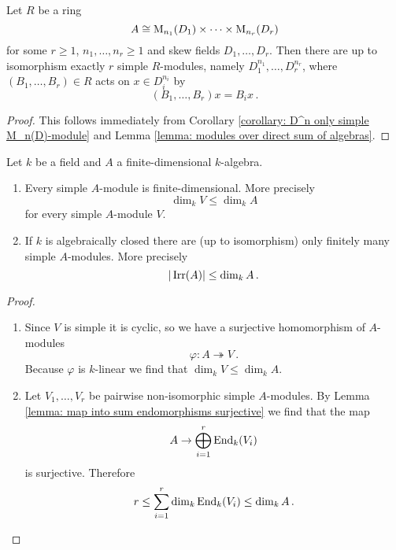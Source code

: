 \begin{corollary}\label{corollary: simple modules over product of matrix algebras}
  Let $R$ be a ring
  \[
                  A
    \cong         \operatorname{M}_{n_1}(D_1)
          \times  \dotsb
          \times  \operatorname{M}_{n_r}(D_r)
  \]
  for some $r \geq 1$, $n_1, \dotsc, n_r \geq 1$ and skew fields $D_1, \dotsc, D_r$.
  Then there are up to isomorphism exactly $r$ simple $R$-modules, namely $D_1^{n_1}, \dotsc, D_r^{n_r}$, where $(B_1, \dotsc, B_r) \in R$ acts on $x \in D_i^{n_i}$ by
  \[
      (B_1, \dotsc, B_r) x
    =  B_i x \,.
  \]
\end{corollary}
\begin{proof}
  This follows immediately from Corollary \ref{corollary: D^n only simple M_n(D)-module} and Lemma \ref{lemma: modules over direct sum of algebras}.
\end{proof}


\begin{proposition}\label{proposition: simple modules over finite-dimensional algebras}
  Let $k$ be a field and $A$ a finite-dimensional $k$-algebra.
  \begin{enumerate}[label=\emph{\alph*)},leftmargin=*]
    \item
      Every simple $A$-module is finite-dimensional.
      More precisely
      \[
        \dim_k V \leq \dim_k A
      \]
      for every simple $A$-module $V$.
    \item
      If $k$ is algebraically closed there are (up to isomorphism) only finitely many simple $A$-modules. More precisely
      \[
        |\operatorname{Irr}(A)| \leq \dim_k A \,.
      \]
  \end{enumerate}
\end{proposition}
\begin{proof}
  \begin{enumerate}[label=\emph{\alph*)},leftmargin=*]
    \item
      Since $V$ is simple it is cyclic, so we have a surjective homomorphism of $A$-modules
      \[
                            \varphi
        \colon              A
        \twoheadrightarrow  V \,.
      \]
      Because $\varphi$ is $k$-linear we find that $\dim_k V \leq \dim_k A$.
    \item
      Let $V_1, \dotsc, V_r$ be pairwise non-isomorphic simple $A$-modules. By Lemma \ref{lemma: map into sum endomorphisms surjective} we find that the map
      \[
            A
        \to \bigoplus_{i=1}^r \operatorname{End}_k(V_i)
      \]
      is surjective. Therefore
      \[
              r
        \leq  \sum_{i=1}^r \dim_k \operatorname{End}_k(V_i)
        \leq  \dim_k A \,.
        \qedhere
      \]
  \end{enumerate}
\end{proof}


